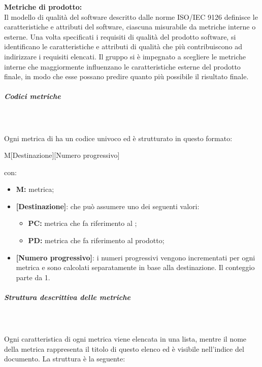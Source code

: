 \textbf{Metriche di prodotto:}\\
Il modello di qualità del software descritto dalle norme ISO/IEC 9126 definisce le caratteristiche e attributi del software, ciascuna misurabile da metriche interne o esterne.
Una volta specificati i requisiti di qualità del prodotto software, si identificano le caratteristiche e attributi di qualità che più contribuiscono ad indirizzare i requisiti elencati.
Il gruppo \Gruppo{} si è impegnato a scegliere le metriche interne che maggiormente influenzano le caratteristiche esterne del prodotto finale, in modo che esse possano predire quanto più possibile il risultato finale.

\subparagraph{Codici metriche}\mbox{}\\ \\
Ogni metrica di  ha un codice univoco ed è strutturato in questo formato:
\begin{center}
    M[Destinazione][Numero progressivo]
\end{center}
con:
\begin{itemize}  
\item \textbf{M:} metrica;
\item \textbf{[Destinazione]}: che può assumere uno dei seguenti valori:
    \begin{itemize}
        \item \textbf{PC:} metrica che fa riferimento al ;
        \item \textbf{PD:} metrica che fa riferimento al prodotto;
    \end{itemize}
    \item \textbf{[Numero progressivo]}: i numeri progressivi vengono incrementati per ogni metrica e sono calcolati separatamente in base alla destinazione. Il conteggio parte da 1.
 \end{itemize}
\subparagraph{Struttura descrittiva delle metriche}\mbox{}\\ \\
Ogni caratteristica di ogni metrica viene elencata in una lista, mentre il nome della metrica rappresenta il titolo di questo elenco ed è visibile nell'indice del documento. La struttura è la seguente:
